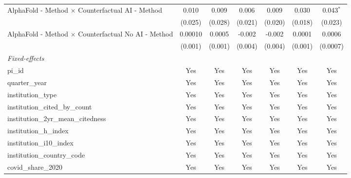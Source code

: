 \begin{tabular}{lcccccc}
   AlphaFold - Method $\times$ Counterfactual AI - Method      & 0.010         & 0.009         & 0.006         & 0.009         & 0.030        & 0.043$^{*}$\\   
                                                               & (0.025)       & (0.028)       & (0.021)       & (0.020)       & (0.018)      & (0.023)\\   
   AlphaFold - Method $\times$ Counterfactual No AI - Method   & 0.00010       & 0.0005        & -0.002        & -0.002        & 0.0001       & 0.0006\\   
                                                               & (0.001)       & (0.001)       & (0.004)       & (0.004)       & (0.001)      & (0.0007)\\   
   \midrule
   \emph{Fixed-effects}\\
   pi\_id                                                      & Yes           & Yes           & Yes           & Yes           & Yes          & Yes\\  
   quarter\_year                                               & Yes           & Yes           & Yes           & Yes           & Yes          & Yes\\  
   institution\_type                                           & Yes           & Yes           & Yes           & Yes           & Yes          & Yes\\  
   institution\_cited\_by\_count                               & Yes           & Yes           & Yes           & Yes           & Yes          & Yes\\  
   institution\_2yr\_mean\_citedness                           & Yes           & Yes           & Yes           & Yes           & Yes          & Yes\\  
   institution\_h\_index                                       & Yes           & Yes           & Yes           & Yes           & Yes          & Yes\\  
   institution\_i10\_index                                     & Yes           & Yes           & Yes           & Yes           & Yes          & Yes\\  
   institution\_country\_code                                  & Yes           & Yes           & Yes           & Yes           & Yes          & Yes\\  
   covid\_share\_2020                                          & Yes           & Yes           & Yes           & Yes           & Yes          & Yes\\  
   \midrule

\end{tabular}
